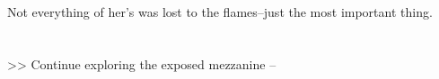 Not everything of her’s was lost to the flames--just the most important thing.\\
\\
\\

>> Continue exploring the exposed mezzanine -- 